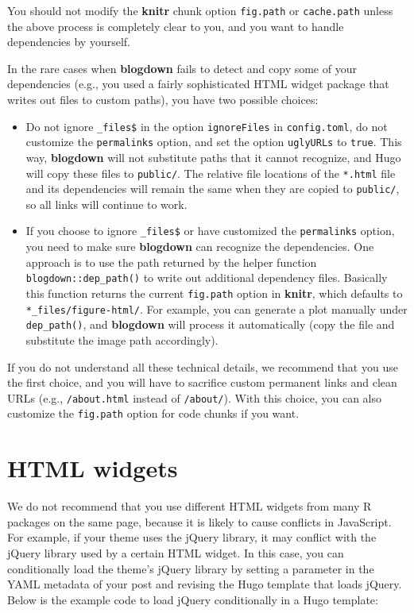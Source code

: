 \documentclass[12pt,]{krantz}
\theoremstyle{definition}
\theoremstyle{definition}
\theoremstyle{definition}
\theoremstyle{remark}
\begin{document}
You should not modify the \textbf{knitr} chunk option \texttt{fig.path}
or \texttt{cache.path} unless the above process is completely clear to
you, and you want to handle dependencies by yourself.

In the rare cases when \textbf{blogdown} fails to detect and copy some
of your dependencies (e.g., you used a fairly sophisticated HTML widget
package that writes out files to custom paths), you have two possible
choices:

\begin{itemize}
\item
  Do not ignore \texttt{\_files\$} in the option \texttt{ignoreFiles} in
  \texttt{config.toml}, do not customize the \texttt{permalinks} option,
  and set the option \texttt{uglyURLs} to \texttt{true}. This way,
  \textbf{blogdown} will not substitute paths that it cannot recognize,
  and Hugo will copy these files to \texttt{public/}. The relative file
  locations of the \texttt{*.html} file and its dependencies will remain
  the same when they are copied to \texttt{public/}, so all links will
  continue to work.
\item
  If you choose to ignore \texttt{\_files\$} or have customized the
  \texttt{permalinks} option, you need to make sure \textbf{blogdown}
  can recognize the dependencies. One approach is to use the path
  returned by the helper function \texttt{blogdown::dep\_path()} to
  write out additional dependency files. Basically this function returns
  the current \texttt{fig.path} option in \textbf{knitr}, which defaults
  to \texttt{*\_files/figure-html/}. For example, you can generate a
  plot manually under \texttt{dep\_path()}, and \textbf{blogdown} will
  process it automatically (copy the file and substitute the image path
  accordingly).
\end{itemize}

If you do not understand all these technical details, we recommend that
you use the first choice, and you will have to sacrifice custom
permanent links and clean URLs (e.g., \texttt{/about.html} instead of
\texttt{/about/}). With this choice, you can also customize the
\texttt{fig.path} option for code chunks if you want.

\section{HTML widgets}\label{html-widgets}

We do not recommend that you use different HTML
widgets from many R packages on the same page,
because it is likely to cause conflicts in JavaScript. For example, if
your theme uses the jQuery library, it may conflict with the jQuery
library used by a certain HTML widget. In this case, you can
conditionally load the theme's jQuery library by setting a
parameter in the YAML metadata of your post and revising the Hugo
template that loads jQuery. Below is the example code to load jQuery
conditionally in a Hugo template:
\end{document}

